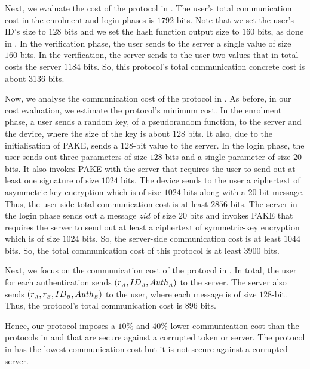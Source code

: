 Next, we evaluate the cost of the protocol in \cite{WangW18}. The user's total communication cost in the enrolment and login phases is $1792$ bits. Note that we set the user's ID's size to $128$ bits and we set the hash function output size to $160$ bits, as done in \cite{WangW18}. In the verification phase, the user sends to the server a single value of size $160$ bits. In the verification, the server sends to the user two values that in total costs the server $1184$ bits. So, this protocol's total communication concrete cost is about $3136$ bits.%


Now, we analyse the communication cost of the protocol in \cite{JareckiJKSS21}. As before, in our cost evaluation, we estimate the protocol's minimum cost.  In the enrolment phase, a user sends a random key, of a pseudorandom function, to the server and the device, where the size of the key is about $128$ bits. It also, due to the initialisation of PAKE, sends a $128$-bit value to the server. In the login phase, the user sends out three parameters of size $128$ bits and a single parameter of size $20$ bits.  It also invokes PAKE with the server that requires the user to send out at least one signature of size $1024$ bits. The device sends to the user a ciphertext of asymmetric-key encryption which is of size $1024$ bits along with a $20$-bit message. Thus, the user-side total communication cost is at least $2856$ bits. The server in the login phase sends out a message $zid$ of size $20$ bits and invokes PAKE that requires the server to send out at least a ciphertext of symmetric-key encryption which is of size $1024$ bits.  So, the server-side communication cost is at least $1044$ bits. So, the total communication cost of this protocol is at least $3900$ bits. 

Next, we focus on the communication cost of the protocol in \cite{MatsuoMY11}. In total, the user for each authentication sends   $(r_{\scriptscriptstyle A}, ID_{\scriptscriptstyle A}, Auth_{\scriptscriptstyle A})$ to the server. The server also sends $(r_{\scriptscriptstyle A}, r_{\scriptscriptstyle B}, ID_{\scriptscriptstyle B}, Auth_{\scriptscriptstyle B})$ to the user, where each message is of size $128$-bit. Thus, the protocol's total communication cost is $896$ bits. 


Hence, our protocol imposes a $10\%$ and $40\%$ lower communication cost than the protocols in \cite{WangW18} and \cite{JareckiJKSS21} that are secure against a corrupted token or server. The protocol in \cite{MatsuoMY11} has the lowest communication cost but it is not secure against a corrupted server. 

